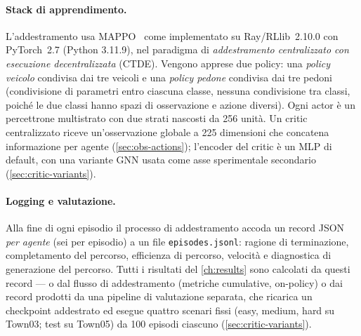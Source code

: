 \paragraph{Stack di apprendimento.}
L'addestramento usa MAPPO~\cite{yu2022surprising} come implementato su
Ray/RLlib~2.10.0 con PyTorch~2.7 (Python 3.11.9), nel paradigma di
\emph{addestramento centralizzato con esecuzione decentralizzata}
(CTDE). Vengono apprese due policy: una \emph{policy veicolo} condivisa
dai tre veicoli e una \emph{policy pedone} condivisa dai tre pedoni
(condivisione di parametri entro ciascuna classe, nessuna condivisione
tra classi, poiché le due classi hanno spazi di osservazione e azione
diversi). Ogni actor è un percettrone multistrato con due strati nascosti
da 256 unità. Un critic centralizzato riceve un'osservazione globale a
225 dimensioni che concatena informazione per agente
(\cref{sec:obs-actions}); l'encoder del critic è un MLP di default, con
una variante GNN usata come asse sperimentale secondario
(\cref{sec:critic-variants}).

\paragraph{Logging e valutazione.}
Alla fine di ogni episodio il processo di addestramento accoda un record
JSON \emph{per agente} (sei per episodio) a un file
\texttt{episodes.jsonl}: ragione di terminazione, completamento del
percorso, efficienza di percorso, velocità e diagnostica di generazione
del percorso. Tutti i risultati del \cref{ch:results} sono calcolati da
questi record --- o dal flusso di addestramento (metriche cumulative,
on-policy) o dai record prodotti da una pipeline di valutazione
separata, che ricarica un checkpoint addestrato ed esegue quattro
scenari fissi (easy, medium, hard su Town03; test su Town05) da 100
episodi ciascuno (\cref{sec:critic-variants}).

